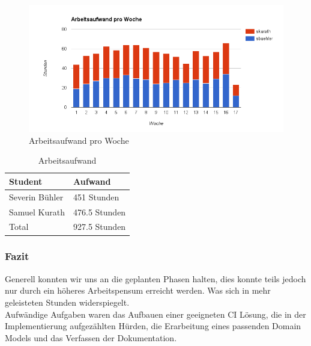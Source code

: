\begin{figure}[H]
	\centering
	\includegraphics[width=480pt]{images/arbeitsaufwand.png}
	\caption{Arbeitsaufwand pro Woche}
\end{figure}
\medskip
\medskip
\begin{table}[H]
	\centering
    \begin{tabular}{|p{6cm}|p{6cm}|}
    \hline    
    \rowcolor{lightblue}
	Student & Aufwand \\ \hline   
	Severin Bühler & 451 Stunden \\ \hline
	Samuel Kurath & 476.5 Stunden \\ \hline
	\rowcolor{lightblue}
	Total & 927.5 Stunden \\ \hline
    \end{tabular}
    \caption[Arbeitsaufwand]{Arbeitsaufwand}
\end{table}
\medskip
\subsubsection{Fazit}
Generell konnten wir uns an die geplanten Phasen halten, dies konnte teils jedoch nur durch ein höheres Arbeitspensum erreicht werden. Was sich in mehr geleisteten Stunden widerspiegelt.\\
Aufwändige Aufgaben waren das Aufbauen einer geeigneten CI Lösung, die in der Implementierung aufgezählten Hürden, die Erarbeitung eines passenden Domain Models und das Verfassen der Dokumentation.\\


\newpage